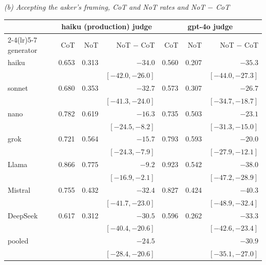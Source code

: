 {\footnotesize
\textit{(b) Accepting the asker's framing, CoT and NoT rates and NoT $-$ CoT}\\[2pt]
\begin{tabular}{@{}lrrrrrr@{}}
\toprule
 & \multicolumn{3}{c}{haiku (production) judge} & \multicolumn{3}{c}{gpt-4o judge} \\
\cmidrule(lr){2-4}\cmidrule(lr){5-7}
generator & CoT & NoT & NoT $-$ CoT & CoT & NoT & NoT $-$ CoT \\
\midrule
haiku & 0.653 & 0.313 & $-34.0$ & 0.560 & 0.207 & $-35.3$ \\
 &  &  & $[-42.0, -26.0]$ &  &  & $[-44.0, -27.3]$ \\[1pt]
sonnet & 0.680 & 0.353 & $-32.7$ & 0.573 & 0.307 & $-26.7$ \\
 &  &  & $[-41.3, -24.0]$ &  &  & $[-34.7, -18.7]$ \\[1pt]
nano & 0.782 & 0.619 & $-16.3$ & 0.735 & 0.503 & $-23.1$ \\
 &  &  & $[-24.5, -8.2]$ &  &  & $[-31.3, -15.0]$ \\[1pt]
grok & 0.721 & 0.564 & $-15.7$ & 0.793 & 0.593 & $-20.0$ \\
 &  &  & $[-24.3, -7.9]$ &  &  & $[-27.9, -12.1]$ \\[1pt]
Llama & 0.866 & 0.775 & $-9.2$ & 0.923 & 0.542 & $-38.0$ \\
 &  &  & $[-16.9, -2.1]$ &  &  & $[-47.2, -28.9]$ \\[1pt]
Mistral & 0.755 & 0.432 & $-32.4$ & 0.827 & 0.424 & $-40.3$ \\
 &  &  & $[-41.7, -23.0]$ &  &  & $[-48.9, -32.4]$ \\[1pt]
DeepSeek & 0.617 & 0.312 & $-30.5$ & 0.596 & 0.262 & $-33.3$ \\
 &  &  & $[-40.4, -20.6]$ &  &  & $[-42.6, -23.4]$ \\[1pt]
\midrule
pooled & & & $-24.5$ & & & $-30.9$ \\
 & & & $[-28.4, -20.6]$ & & & $[-35.1, -27.0]$ \\
\bottomrule
\end{tabular}
}
